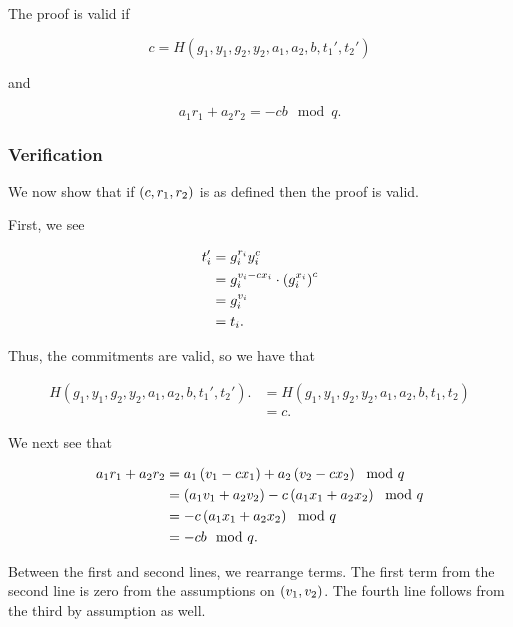 \noindent
The proof is valid if

\begin{equation}
    c = H(g_{1},y_{1},g_{2},y_{2},a_{1},a_{2},b,t_{1}',t_{2}')
\end{equation}

\noindent
and

\begin{equation}
    a_{1}r_{1} + a_{2}r_{2} = -cb \mod q.
\end{equation}

\subsubsection{Verification}

We now show that if $\left( c,r_{1},r_{2} \right)$ is as defined
then the proof is valid.

First, we see

\begin{align}
    t_{i}' &= g_{i}^{r_{i}}y_{i}^{c}
            \nonumber\\
        &= g_{i}^{v_{i}-cx_{i}}\cdot\left( g_{i}^{x_{i}} \right)^{c}
            \nonumber\\
        &= g_{i}^{v_{i}}
            \nonumber\\
        &= t_{i}.
\end{align}

\noindent
Thus, the commitments are valid, so we have that

\begin{align}
    H(g_{1},y_{1},g_{2},y_{2},a_{1},a_{2},b,t_{1}',t_{2}').
        &= H(g_{1},y_{1},g_{2},y_{2},a_{1},a_{2},b,t_{1},t_{2})
            \nonumber\\
        &= c.
\end{align}

\noindent
We next see that

\begin{align}
    a_{1}r_{1} + a_{2}r_{2}
        &= a_{1}\left( v_{1}-cx_{1} \right) + a_{2}\left( v_{2}-cx_{2} \right) \mod q
            \nonumber\\
        &= \left( a_{1}v_{1} + a_{2}v_{2} \right) - c\left( a_{1}x_{1} + a_{2}x_{2} \right)
                \mod q
            \nonumber\\
        &= -c\left( a_{1}x_{1} + a_{2}x_{2} \right) \mod q
            \nonumber\\
        &= -cb \mod q.
\end{align}

\noindent
Between the first and second lines, we rearrange terms.
The first term from the second line is zero from the assumptions
on $\left( v_{1},v_{2} \right)$.
The fourth line follows from the third by assumption as well.

